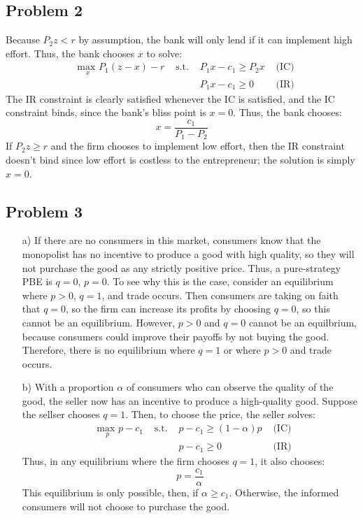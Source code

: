 \documentclass{article}
\newcommand{\usmax}[1]{\underset{#1}{\text{max }}}
\begin{document}

\subsection*{Problem 2}
Because ${P_2z<r}$ by assumption, the bank will only lend if it can implement high effort. Thus, the bank chooses $x$ to solve:
\begin{align*}
	&\usmax{x}P_1(z-x) - r	&\text{ s.t. }	&P_1x-c_1\geq P_2x	&\text{ (IC)}	\\
	&						&				&P_1x-c_1\geq 0		&\text{ (IR)}
\end{align*}
The IR constraint is clearly satisfied whenever the IC is satisfied, and the IC constraint binds, since the bank's bliss point is ${x=0}$. Thus, the bank chooses:
\[
	x = \frac{c_1}{P_1-P_2}
\]
If ${P_2z\geq r}$ and the firm chooses to implement low effort, then the IR constraint doesn't bind since low effort is costless to the entrepreneur; the solution is simply ${x=0}$. 

\pagebreak
\subsection*{Problem 3}

\begin{itemize}
	\item[a)] If there are no consumers in this market, consumers know that the monopolist has no incentive to produce a good with high quality, so they will not purchase the good as any strictly positive price. Thus, a pure-strategy PBE is ${q=0}$, ${p=0}$. To see why this is the case, consider an equilibrium where ${p>0}$, ${q=1}$, and trade occurs. Then consumers are taking on faith that ${q=0}$, so the firm can increase its profits by choosing ${q=0}$, so this cannot be an equilibrium. However, ${p>0}$ and ${q=0}$ cannot be an equilbrium, because consumers could improve their payoffs by not buying the good. Therefore, there is no equilibrium where ${q=1}$ or where ${p>0}$ and trade occurs.
	
	\item[b)] With a proportion $\alpha$ of consumers who can observe the quality of the good, the seller now has an incentive to produce a high-quality good. Suppose the sellser chooses ${q=1}$. Then, to choose the price, the seller solves:
		\begin{align*}
			&\usmax{p}p-c_1	&\text{ s.t. }	&p-c_1 \geq (1-\alpha)p	&\text{ (IC)}	\\
			&				&				&p-c_1\geq 0								&\text{ (IR)}
		\end{align*}
		Thus, in any equilibrium where the firm chooses ${q=1}$, it also chooses:
		\[
			p =\frac{c_1}{\alpha}
		\]
		This equilibrium is only possible, then, if ${\alpha\geq c_1}$. Otherwise, the informed consumers will not choose to purchase the good.
		
\end{itemize}

\end{document}
